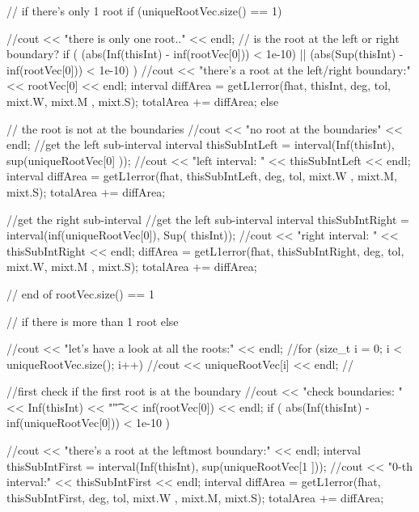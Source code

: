 \begin{DoxyCode}
{{{      // if there's only 1 root
      if (uniqueRootVec.size() == 1) {
        //cout << "there is only one root.." << endl;
        // is the root at the left or right boundary?
        if ( (abs(Inf(thisInt) - inf(rootVec[0])) < 1e-10) || 
            (abs(Sup(thisInt) - inf(rootVec[0])) < 1e-10) ) {
          //cout << "there's a root at the left/right boundary:" << rootVec[0]
       << endl;
          interval diffArea = getL1error(fhat, thisInt, deg, tol, mixt.W, mixt.M
      , mixt.S);
          totalArea += diffArea;
        }
        else { // the root is not at the boundaries
          //cout << "no root at the boundaries" << endl;
          //get the left sub-interval
          interval thisSubIntLeft = interval(Inf(thisInt), sup(uniqueRootVec[0]
      ));
          //cout << "left interval: " << thisSubIntLeft << endl; 
          interval diffArea = getL1error(fhat, thisSubIntLeft, deg, tol, mixt.W
      , mixt.M, mixt.S);
          totalArea += diffArea;
          
          //get the right sub-interval
          //get the left sub-interval
          interval thisSubIntRight = interval(inf(uniqueRootVec[0]), Sup(
      thisInt));
          //cout << "right interval: " << thisSubIntRight << endl; 
          diffArea = getL1error(fhat, thisSubIntRight, deg, tol, mixt.W, mixt.M
      , mixt.S);
          totalArea += diffArea;
        }
      } // end of rootVec.size() == 1

        // if there is more than 1 root
      else {
        //cout << "let's have a look at all the roots:" << endl;
        //for (size_t i = 0; i < uniqueRootVec.size(); i++) {
          //cout << uniqueRootVec[i] << endl;
        //}

        //first check if the first root is at the boundary
        //cout << "check boundaries: " << Inf(thisInt) << "\t" <<
       inf(rootVec[0]) << endl;
        if ( abs(Inf(thisInt) - inf(uniqueRootVec[0])) < 1e-10 ) {
          //cout << "there's a root at the leftmost boundary:" << endl;
          interval thisSubIntFirst = interval(Inf(thisInt), sup(uniqueRootVec[1
      ]));
          //cout << "0-th interval:" << thisSubIntFirst << endl; 
          interval diffArea = getL1error(fhat, thisSubIntFirst, deg, tol, mixt.W
      , mixt.M, mixt.S);
          totalArea += diffArea;
          
}}}}}
\end{DoxyCode}
